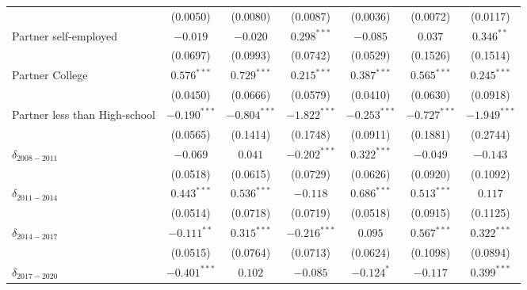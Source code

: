 \begin{tabular}{l|ccc|ccc}
                              &        (0.0050) &        (0.0080) &        (0.0087) &             (0.0036) &        (0.0072) &        (0.0117) \\
Partner self-employed         &        $-0.019$ &        $-0.020$ &   $0.298^{***}$ &             $-0.085$ &         $0.037$ &    $0.346^{**}$ \\
                              &        (0.0697) &        (0.0993) &        (0.0742) &             (0.0529) &        (0.1526) &        (0.1514) \\
Partner College               &   $0.576^{***}$ &   $0.729^{***}$ &   $0.215^{***}$ &        $0.387^{***}$ &   $0.565^{***}$ &   $0.245^{***}$ \\
                              &        (0.0450) &        (0.0666) &        (0.0579) &             (0.0410) &        (0.0630) &        (0.0918) \\
Partner less than High-school &  $-0.190^{***}$ &  $-0.804^{***}$ &  $-1.822^{***}$ &       $-0.253^{***}$ &  $-0.727^{***}$ &  $-1.949^{***}$ \\
                              &        (0.0565) &        (0.1414) &        (0.1748) &             (0.0911) &        (0.1881) &        (0.2744) \\
$\delta_{2008-2011}$          &        $-0.069$ &         $0.041$ &  $-0.202^{***}$ &        $0.322^{***}$ &        $-0.049$ &        $-0.143$ \\
                              &        (0.0518) &        (0.0615) &        (0.0729) &             (0.0626) &        (0.0920) &        (0.1092) \\
$\delta_{2011-2014}$          &   $0.443^{***}$ &   $0.536^{***}$ &        $-0.118$ &        $0.686^{***}$ &   $0.513^{***}$ &         $0.117$ \\
                              &        (0.0514) &        (0.0718) &        (0.0719) &             (0.0518) &        (0.0915) &        (0.1125) \\
$\delta_{2014-2017}$          &   $-0.111^{**}$ &   $0.315^{***}$ &  $-0.216^{***}$ &              $0.095$ &   $0.567^{***}$ &   $0.322^{***}$ \\
                              &        (0.0515) &        (0.0764) &        (0.0713) &             (0.0624) &        (0.1098) &        (0.0894) \\
$\delta_{2017-2020}$          &  $-0.401^{***}$ &         $0.102$ &        $-0.085$ &           $-0.124^*$ &        $-0.117$ &   $0.399^{***}$ \\

\end{tabular}

